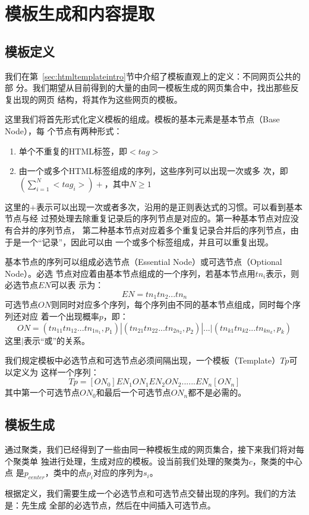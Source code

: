 
\chapter{模板生成和内容提取}
\label{chap:template}
\section{模板定义}
我们在第~\ref{sec:htmltemplateintro}节中介绍了模板直观上的定义：不同网页公共的部
分。我们期望从目前得到的大量的由同一模板生成的网页集合中，找出那些反复出现的网页
结构，将其作为这些网页的模板。

这里我们将首先形式化定义模板的组成。模板的基本元素是基本节点（Base Node），每
个节点有两种形式：
\begin{enumerate}
\item 单个不重复的HTML标签，即$<tag>$
\item 由一个或多个HTML标签组成的序列，这些序列可以出现一次或多
  次，即$(\sum_{i=1}^N<tag_i>)+$，其中$N \ge 1$
\end{enumerate}
这里的$+$表示可以出现一次或者多次，沿用的是正则表达式的习惯。可以看到基本节点与经
过预处理去除重复记录后的序列节点是对应的。第一种基本节点对应没有合并的序列节点，
第二种基本节点对应着多个重复记录合并后的序列节点，由于是一个“记录”，因此可以由
一个或多个标签组成，并且可以重复出现。

基本节点的序列可以组成必选节点（Essential Node）或可选节点（Optional Node）。必选
节点对应着由基本节点组成的一个序列，若基本节点用$tn_i$表示，则必选节点$EN$可以表
示为：
\[
EN=tn_1tn_2...tn_n
\]
可选节点$ON$则同时对应多个序列，每个序列由不同的基本节点组成，同时每个序列还对应
着一个出现概率$p$，即：
\[
ON=(tn_{11}tn_{12}...tn_{1n_1},p_1)|(tn_{21}tn_{22}...tn_{2n_2},p_2)|...|(tn_{k1}tn_{k2}...tn_{kn_k},p_k)
\]
这里$|$表示“或”的关系。

我们规定模板中必选节点和可选节点必须间隔出现，一个模板（Template）$Tp$可以定义为
这样一个序列：
\[
Tp=[ON_0]EN_1ON_1EN_2ON_2......EN_n[ON_n]
\]
其中第一个可选节点$ON_0$和最后一个可选节点$ON_n$都不是必需的。
\section{模板生成}
\label{sec:templategen}
通过聚类，我们已经得到了一些由同一种模板生成的网页集合，接下来我们将对每个聚类单
独进行处理，生成对应的模板。设当前我们处理的聚类为$c$，聚类的中心点
是$p_{center}$，类中的点$p_i$对应的序列为$s_i$。

根据定义，我们需要生成一个必选节点和可选节点交替出现的序列。我们的方法是：先生成
全部的必选节点，然后在中间插入可选节点。


